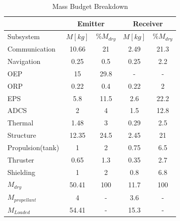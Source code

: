 \begin{table}[ht!]
\centering
\begin{tabular}{|l|c|c|c|c|}
\hline
 & \multicolumn{2}{|c|}{Emitter} & \multicolumn{2}{|c|}{Receiver} \\\hline
 Subsystem        & $M [kg]$ & \%$M_{dry}$ & $M [kg]$ & \%$M_{dry}$ \\\hline\hline
 Communication    & 10.66    & 21        & 2.49       & 21.3 \\\hline
 Navigation       & 0.25     & 0.5       & 0.25       & 2.2 \\\hline
 OEP              & 15       & 29.8      & -          & - \\\hline
 ORP              & 0.22     & 0.4       & 0.22       & 2 \\\hline
 EPS              & 5.8      & 11.5      & 2.6        & 22.2 \\\hline
 ADCS             & 2        & 4         & 1.5        & 12.8 \\\hline
 Thermal          & 1.48     & 3         & 0.29       & 2.5 \\\hline
 Structure        & 12.35    & 24.5      & 2.45       & 21 \\\hline
 Propulsion(tank) & 1        & 2         & 0.75       & 6.5 \\\hline
 Thruster         & 0.65     & 1.3       & 0.35       & 2.7 \\\hline
 Shielding        & 1        & 2         & 0.8        & 6.8 \\\hline\hline
 $M_{dry}$        & 50.41    & 100       & 11.7       & 100 \\\hline
 $M_{propellant}$ & 4        & -         & 3.6        & - \\\hline\hline
 $M_{Loaded}$     & 54.41    & -         & 15.3       & - \\\hline
\end{tabular}
\caption{Mass Budget Breakdown}
\label{tab:MB}
\end{table}

